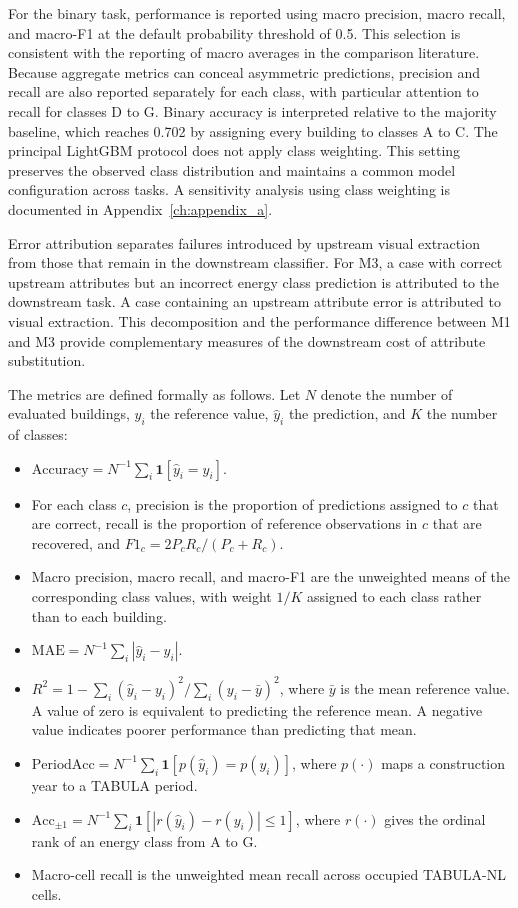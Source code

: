 For the binary task, performance is reported using macro precision, macro recall, and macro-F1 at the default probability threshold of 0.5.
This selection is consistent with the reporting of macro averages in the comparison literature.
Because aggregate metrics can conceal asymmetric predictions, precision and recall are also reported separately for each class, with particular attention to recall for classes D to G.
Binary accuracy is interpreted relative to the majority baseline, which reaches 0.702 by assigning every building to classes A to C.
The principal LightGBM protocol does not apply class weighting.
This setting preserves the observed class distribution and maintains a common model configuration across tasks.
A sensitivity analysis using class weighting is documented in Appendix~\ref{ch:appendix_a}.

Error attribution separates failures introduced by upstream visual extraction from those that remain in the downstream classifier.
For M3, a case with correct upstream attributes but an incorrect energy class prediction is attributed to the downstream task.
A case containing an upstream attribute error is attributed to visual extraction.
This decomposition and the performance difference between M1 and M3 provide complementary measures of the downstream cost of attribute substitution.

The metrics are defined formally as follows.
Let $N$ denote the number of evaluated buildings, $y_i$ the reference value, $\hat{y}_i$ the prediction, and $K$ the number of classes:

\begin{itemize}
	\item $\mathrm{Accuracy} = N^{-1}\sum_i \mathbf{1}[\hat{y}_i = y_i]$.
	\item For each class $c$, precision is the proportion of predictions assigned to $c$ that are correct, recall is the proportion of reference observations in $c$ that are recovered, and $F1_c = 2P_cR_c/(P_c+R_c)$.
	\item Macro precision, macro recall, and macro-F1 are the unweighted means of the corresponding class values, with weight $1/K$ assigned to each class rather than to each building.
	\item $\mathrm{MAE} = N^{-1}\sum_i |\hat{y}_i - y_i|$.
	\item $R^2 = 1 - \sum_i(\hat{y}_i-y_i)^2 / \sum_i(y_i-\bar{y})^2$, where $\bar{y}$ is the mean reference value. A value of zero is equivalent to predicting the reference mean. A negative value indicates poorer performance than predicting that mean.
	\item $\mathrm{PeriodAcc} = N^{-1}\sum_i \mathbf{1}[p(\hat{y}_i) = p(y_i)]$, where $p(\cdot)$ maps a construction year to a TABULA period.
	\item $\mathrm{Acc}_{\pm 1} = N^{-1}\sum_i \mathbf{1}[|r(\hat{y}_i)-r(y_i)| \leq 1]$, where $r(\cdot)$ gives the ordinal rank of an energy class from A to G.
	\item Macro-cell recall is the unweighted mean recall across occupied TABULA-NL cells.
\end{itemize}

